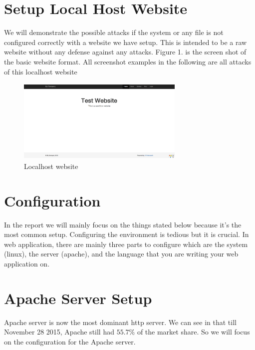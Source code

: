 \documentclass[conference]{IEEEtran}
\begin{document}
\section{Setup Local Host Website}
We will demonstrate the possible attacks if the system or any file is not configured correctly with a website we have setup. This is intended to be a raw website without any defense against any attacks. Figure 1. is the screen shot of the basic website format. All screenshot examples in the following are all attacks of this localhost website
\begin{figure}[h]
\includegraphics[width=8cm, height=4cm]{yii}
\centering
\caption{Localhost website}
\end{figure}

\section{Configuration}
In the report we will mainly focus on the things stated below
because it's the most common setup. Configuring the environment is tedious but it is crucial. In web application, there are mainly three parts to configure
which are the system (linux), the server (apache), and the language that you are writing your web application on.

\section{Apache Server Setup}
Apache server is now the most dominant http server. We can see in \cite{ApachePopularity} that till November 28 2015, Apache still had $55.7\%$ of the market share. So we will focus on the configuration for the Apache server.
\end{document}
